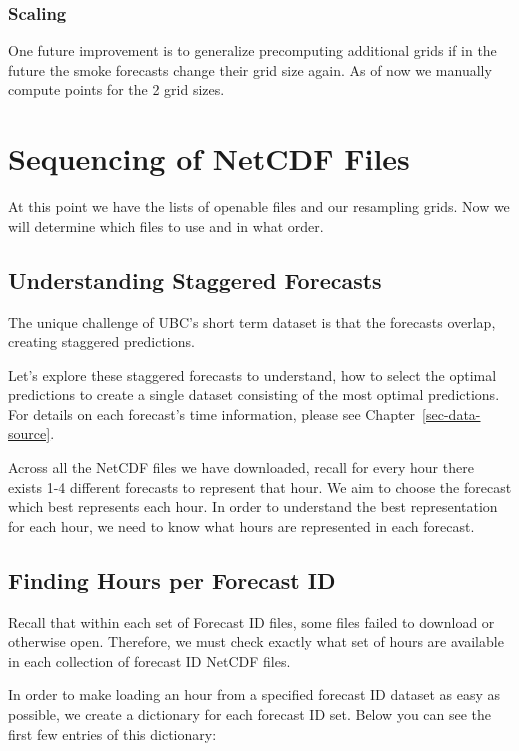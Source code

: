 \documentclass[
  letterpaper,
  DIV=11,
  numbers=noendperiod]{scrreprt}
\begin{document}
\subsubsection{Scaling}\label{scaling}

One future improvement is to generalize precomputing additional grids if
in the future the smoke forecasts change their grid size again. As of
now we manually compute points for the 2 grid sizes.

\section{Sequencing of NetCDF Files}\label{sec-sequencing}

At this point we have the lists of openable files and our resampling
grids. Now we will determine which files to use and in what order.

\subsection{Understanding Staggered
Forecasts}\label{understanding-staggered-forecasts}

The unique challenge of UBC's short term dataset is that the forecasts
overlap, creating staggered predictions.

Let's explore these staggered forecasts to understand, how to select the
optimal predictions to create a single dataset consisting of the most
optimal predictions. For details on each forecast's time information,
please see Chapter~\ref{sec-data-source}.

Across all the NetCDF files we have downloaded, recall for every hour
there exists 1-4 different forecasts to represent that hour. We aim to
choose the forecast which best represents each hour. In order to
understand the best representation for each hour, we need to know what
hours are represented in each forecast.

\subsection{Finding Hours per Forecast
ID}\label{finding-hours-per-forecast-id}

Recall that within each set of Forecast ID files, some files failed to
download or otherwise open. Therefore, we must check exactly what set of
hours are available in each collection of forecast ID NetCDF files.

In order to make loading an hour from a specified forecast ID dataset as
easy as possible, we create a dictionary for each forecast ID set. Below
you can see the first few entries of this dictionary:
\end{document}
